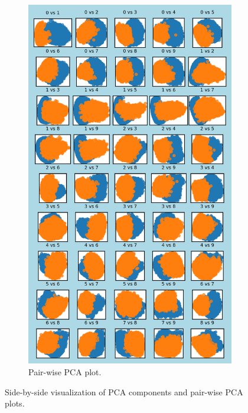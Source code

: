 \documentclass{article}
\begin{document}
\begin{figure}[h!]
    \begin{subfigure}[t]{0.45\textwidth}
        \centering
        \includegraphics[width=\textwidth]{./plots/plot3.png} %
        \caption{Pair-wise PCA plot.}
        \label{fig:plot2b}
    \end{subfigure}
    \caption{Side-by-side visualization of PCA components and pair-wise PCA plots.}
    \label{fig:side_by_side}
\end{figure}
\end{document}
